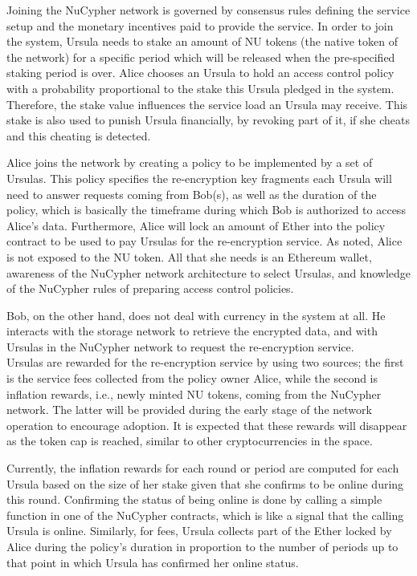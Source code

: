 \documentclass{llncs}
\begin{document}
Joining the NuCypher network is governed by consensus rules defining the service setup
and the monetary incentives paid to provide the service. In order to join the 
system, Ursula needs to stake an amount of NU tokens (the native token of the network) for a specific period
which will be released when the pre-specified staking period is over. Alice chooses an
Ursula to hold an access control policy with a probability proportional to the stake this Ursula 
pledged in the system. Therefore, the stake value influences the service load an Ursula
may receive. This stake is also used to punish Ursula financially, by revoking part 
of it, if she cheats and this cheating is detected. 


Alice joins the network by creating a policy to be implemented by a 
set of Ursulas. This policy specifies the re-encryption key fragments each Ursula will
need to answer requests coming from Bob(s), as well as the duration of the policy, which 
is basically the timeframe during which Bob is authorized to access Alice's data.  Furthermore,
Alice will lock an amount of Ether into the policy contract to be used to pay Ursulas for the re-encryption 
service. As noted, Alice is not exposed to the NU token. All that she needs is an Ethereum
wallet, awareness of the NuCypher network architecture to select Ursulas, and knowledge of the
NuCypher rules of preparing access control policies.


Bob, on the other hand, does not deal with currency in the system at all. He interacts with the storage 
network to retrieve the encrypted data, and with Ursulas in the NuCypher network to request the
re-encryption service. \\


 Ursulas are rewarded for the re-encryption service by using two sources; the first is the service fees collected from the policy owner Alice, while the second is inflation rewards, i.e., newly minted NU tokens, coming from the NuCypher network. The latter will be provided during the 
early stage of the network operation to encourage adoption. It is expected that these rewards will disappear as the token cap is reached, similar to other cryptocurrencies in the space.


Currently, the inflation rewards for each round or period are computed for each Ursula based on the size of her stake given that she confirms to be online during this round. Confirming the status of being online is done by calling a 
simple function in one of the NuCypher contracts, which is like a signal that the calling Ursula is online. Similarly, for fees, Ursula collects part of the Ether locked by Alice during the policy's duration in proportion to the number of periods up to that point in which Ursula has confirmed her online status.
\end{document}

